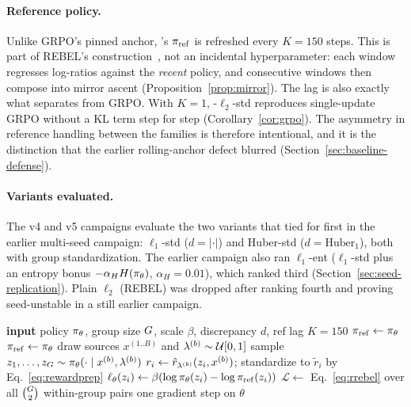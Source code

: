 \paragraph{Reference policy.}
Unlike GRPO's pinned anchor, \rrebel{}'s $\pi_{\mathrm{ref}}$ is refreshed every
$K = 150$ steps. This is part of REBEL's construction~\citep{gao2024rebel},
not an incidental hyperparameter: each window regresses log-ratios against the
\emph{recent} policy, and consecutive windows then compose into mirror ascent
(Proposition~\ref{prop:mirror}). The lag is also exactly what separates
\rrebel{} from GRPO. With $K = 1$, \rrebel{}-$\ell_2$-std reproduces
single-update GRPO without a KL term step for step
(Corollary~\ref{cor:grpo}). The asymmetry in reference handling between the
families is therefore intentional, and it is the distinction that the earlier
rolling-anchor defect blurred (Section~\ref{sec:baseline-defense}).

\paragraph{Variants evaluated.}
The v4 and v5 campaigns evaluate the two variants that tied for first in the
earlier multi-seed campaign: $\ell_1$-std ($d = |\cdot|$) and Huber-std
($d = \mathrm{Huber}_1$), both with group standardization. The earlier campaign
also ran $\ell_1$-ent ($\ell_1$-std plus an entropy bonus
$-\alpha_H H(\pi_\theta)$, $\alpha_H = 0.01$), which ranked third
(Section~\ref{sec:seed-replication}). Plain $\ell_2$ (REBEL) was dropped after
ranking fourth and proving seed-unstable in a still earlier campaign.

\begin{algorithm}[t]
\caption{\rrebel{} (robust pairwise reward-difference regression)}
\label{alg:rrebel}
\begin{algorithmic}[1]
\STATE \textbf{input} policy $\pi_\theta$, group size $G$, scale $\beta$, discrepancy $d$, ref lag $K = 150$
\STATE $\pi_{\mathrm{ref}} \leftarrow \pi_\theta$
    \STATE $\pi_{\mathrm{ref}} \leftarrow \pi_\theta$ 
  \ENDIF
  \STATE draw sources $x^{(1..B)}$ and $\lambda^{(b)} \sim \mathcal{U}[0,1]$
    \STATE sample $z_1,\dots,z_G \sim \pi_\theta(\cdot \mid x^{(b)}, \lambda^{(b)})$
    \STATE $r_i \leftarrow \hat{r}_{\lambda^{(b)}}(z_i, x^{(b)})$; standardize to $\tilde{r}_i$ by Eq.~\eqref{eq:rewardprep}
    \STATE $\ell_\theta(z_i) \leftarrow \beta(\log \pi_\theta(z_i) - \log \pi_{\mathrm{ref}}(z_i))$
  \ENDFOR
  \STATE $\mathcal{L} \leftarrow$ Eq.~\eqref{eq:rrebel} over all $\binom{G}{2}$ within-group pairs
  \STATE one gradient step on $\theta$
\ENDFOR
\end{algorithmic}
\end{algorithm}
